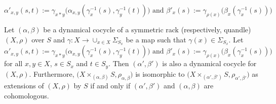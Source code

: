 \documentclass[10pt,a4paper]{amsart}
\begin{document}
	\begin{equation}\label{cohomologous dynamical cocycle}
		\alpha'_{x,y}(s,t):= \gamma_{x*y}\big(\alpha_{x,y}(\gamma_x^{-1}(s),\gamma_y^{-1}(t))\big)
		\text{ and }
		\beta'_x(s):=\gamma_{\rho(x)}\big(\beta_x(\gamma_x^{-1}(s))\big)
	\end{equation}

\begin{proposition}\label{equivalence of dynamical extensions}
	Let $(\alpha,\beta)$ be a dynamical cocycle of a symmetric rack (respectively, quandle) $(X,\rho)$ over $S$ and $\gamma:X \rightarrow \cup_{x \in X}\Sigma_{S_x}$ be a map such that $\gamma(x) \in \Sigma_{S_x}$. Let
	\begin{equation*}
		\alpha'_{x,y}(s,t):= \gamma_{x*y}\big(\alpha_{x,y}(\gamma_x^{-1}(s),\gamma_y^{-1}(t))\big)
		\text{ and }
		\beta'_x(s):=\gamma_{\rho(x)}\big(\beta_x(\gamma_x^{-1}(s))\big)
	\end{equation*}
for all $x,y \in X$, $s\in S_x$ and $t \in S_y$. Then $(\alpha',\beta')$ is also a dynamical cocycle for $(X,\rho)$. Furthermore, 
$\big(X \times_{(\alpha,\beta)}S,\rho_{\alpha,\beta}\big)$ is isomorphic to $\big(X \times_{(\alpha',\beta')}S,\rho_{\alpha',\beta'}\big)$ as extensions of $(X,\rho)$ by $S$ if and only if $(\alpha',\beta')$ and $(\alpha, \beta)$ are cohomologous.
\end{proposition}
\end{document}
